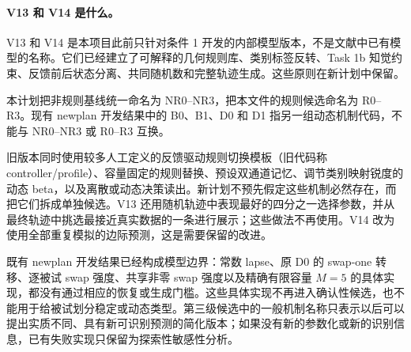 \paragraph{V13 和 V14 是什么。}
V13 和 V14 是本项目此前只针对条件 1 开发的内部模型版本，不是文献中已有模型的名称。它们已经建立了可解释的几何规则库、类别标签反转、Task 1b 知觉约束、反馈前后状态分离、共同随机数和完整轨迹生成。这些原则在新计划中保留。

本计划把非规则基线统一命名为 NR0--NR3，把本文件的规则候选命名为 R0--R3。现有 newplan 开发结果中的 B0、B1、D0 和 D1 指另一组动态机制代码，不能与 NR0--NR3 或 R0--R3 互换。

旧版本同时使用较多人工定义的反馈驱动规则切换模板（旧代码称 controller/profile）、容量固定的规则替换、预设双通道记忆、调节类别映射锐度的动态 beta，以及离散或动态决策读出。新计划不预先假定这些机制必然存在，而把它们拆成单独候选。V13 还用随机轨迹中表现最好的四分之一选择参数，并从最终轨迹中挑选最接近真实数据的一条进行展示；这些做法不再使用。V14 改为使用全部重复模拟的边际预测，这是需要保留的改进。

既有 newplan 开发结果已经构成模型边界：常数 lapse、原 D0 的 swap-one 转移、逐被试 swap 强度、共享非零 swap 强度以及精确有限容量 $M=5$ 的具体实现，都没有通过相应的恢复或生成门槛。这些具体实现不再进入确认性候选，也不能用于给被试划分稳定或动态类型。第三级候选中的一般机制名称只表示以后可以提出实质不同、具有新可识别预测的简化版本；如果没有新的参数化或新的识别信息，已有失败实现只保留为探索性敏感性分析。

